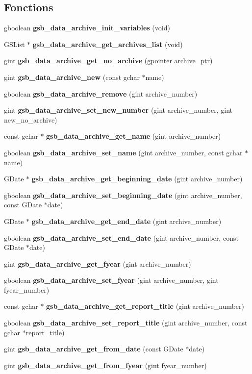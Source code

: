 \subsection*{Fonctions}
\begin{DoxyCompactItemize}
\item 
gboolean {\bf gsb\_\-data\_\-archive\_\-init\_\-variables} (void)
\item 
GSList $\ast$ {\bf gsb\_\-data\_\-archive\_\-get\_\-archives\_\-list} (void)
\item 
gint {\bf gsb\_\-data\_\-archive\_\-get\_\-no\_\-archive} (gpointer archive\_\-ptr)
\item 
gint {\bf gsb\_\-data\_\-archive\_\-new} (const gchar $\ast$name)
\item 
gboolean {\bf gsb\_\-data\_\-archive\_\-remove} (gint archive\_\-number)
\item 
gint {\bf gsb\_\-data\_\-archive\_\-set\_\-new\_\-number} (gint archive\_\-number, gint new\_\-no\_\-archive)
\item 
const gchar $\ast$ {\bf gsb\_\-data\_\-archive\_\-get\_\-name} (gint archive\_\-number)
\item 
gboolean {\bf gsb\_\-data\_\-archive\_\-set\_\-name} (gint archive\_\-number, const gchar $\ast$name)
\item 
GDate $\ast$ {\bf gsb\_\-data\_\-archive\_\-get\_\-beginning\_\-date} (gint archive\_\-number)
\item 
gboolean {\bf gsb\_\-data\_\-archive\_\-set\_\-beginning\_\-date} (gint archive\_\-number, const GDate $\ast$date)
\item 
GDate $\ast$ {\bf gsb\_\-data\_\-archive\_\-get\_\-end\_\-date} (gint archive\_\-number)
\item 
gboolean {\bf gsb\_\-data\_\-archive\_\-set\_\-end\_\-date} (gint archive\_\-number, const GDate $\ast$date)
\item 
gint {\bf gsb\_\-data\_\-archive\_\-get\_\-fyear} (gint archive\_\-number)
\item 
gboolean {\bf gsb\_\-data\_\-archive\_\-set\_\-fyear} (gint archive\_\-number, gint fyear\_\-number)
\item 
const gchar $\ast$ {\bf gsb\_\-data\_\-archive\_\-get\_\-report\_\-title} (gint archive\_\-number)
\item 
gboolean {\bf gsb\_\-data\_\-archive\_\-set\_\-report\_\-title} (gint archive\_\-number, const gchar $\ast$report\_\-title)
\item 
gint {\bf gsb\_\-data\_\-archive\_\-get\_\-from\_\-date} (const GDate $\ast$date)
\item 
gint {\bf gsb\_\-data\_\-archive\_\-get\_\-from\_\-fyear} (gint fyear\_\-number)
\end{DoxyCompactItemize}


